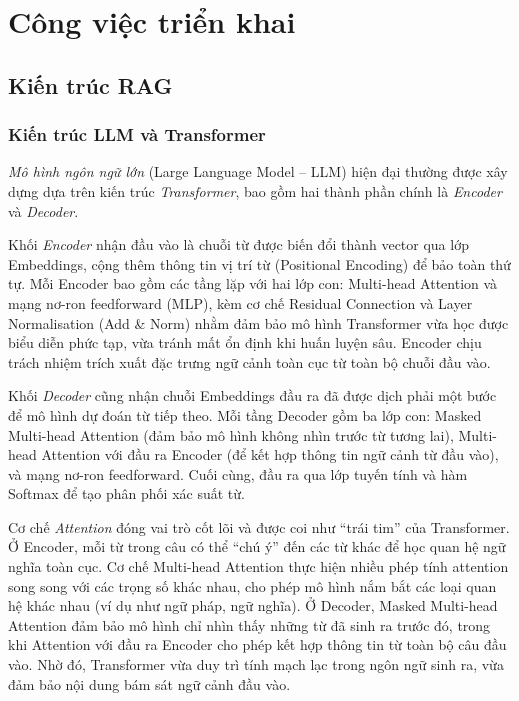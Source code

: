 \chapter{Công việc triển khai}

\section{Kiến trúc RAG}

\subsection{Kiến trúc LLM và Transformer}

\emph{Mô hình ngôn ngữ lớn} (Large Language Model -- LLM) hiện đại thường được xây dựng dựa trên kiến trúc \emph{Transformer}, bao gồm hai thành phần chính là \emph{Encoder} và \emph{Decoder}.

Khối \emph{Encoder} nhận đầu vào là chuỗi từ được biến đổi thành vector qua lớp Embeddings, cộng thêm thông tin vị trí từ (Positional Encoding) để bảo toàn thứ tự. Mỗi Encoder bao gồm các tầng lặp với hai lớp con: Multi-head Attention và mạng nơ-ron feedforward (MLP), kèm cơ chế Residual Connection và Layer Normalisation (Add \& Norm) nhằm đảm bảo mô hình Transformer vừa học được biểu diễn phức tạp, vừa tránh mất ổn định khi huấn luyện sâu. Encoder chịu trách nhiệm trích xuất đặc trưng ngữ cảnh toàn cục từ toàn bộ chuỗi đầu vào.

Khối \emph{Decoder} cũng nhận chuỗi Embeddings đầu ra đã được dịch phải một bước để mô hình dự đoán từ tiếp theo. Mỗi tầng Decoder gồm ba lớp con: Masked Multi-head Attention (đảm bảo mô hình không nhìn trước từ tương lai), Multi-head Attention với đầu ra Encoder (để kết hợp thông tin ngữ cảnh từ đầu vào), và mạng nơ-ron feedforward. Cuối cùng, đầu ra qua lớp tuyến tính và hàm Softmax để tạo phân phối xác suất từ.

Cơ chế \emph{Attention} đóng vai trò cốt lõi và được coi như ``trái tim'' của Transformer. Ở Encoder, mỗi từ trong câu có thể ``chú ý'' đến các từ khác để học quan hệ ngữ nghĩa toàn cục. Cơ chế Multi-head Attention thực hiện nhiều phép tính attention song song với các trọng số khác nhau, cho phép mô hình nắm bắt các loại quan hệ khác nhau (ví dụ như ngữ pháp, ngữ nghĩa). Ở Decoder, Masked Multi-head Attention đảm bảo mô hình chỉ nhìn thấy những từ đã sinh ra trước đó, trong khi Attention với đầu ra Encoder cho phép kết hợp thông tin từ toàn bộ câu đầu vào. Nhờ đó, Transformer vừa duy trì tính mạch lạc trong ngôn ngữ sinh ra, vừa đảm bảo nội dung bám sát ngữ cảnh đầu vào.

